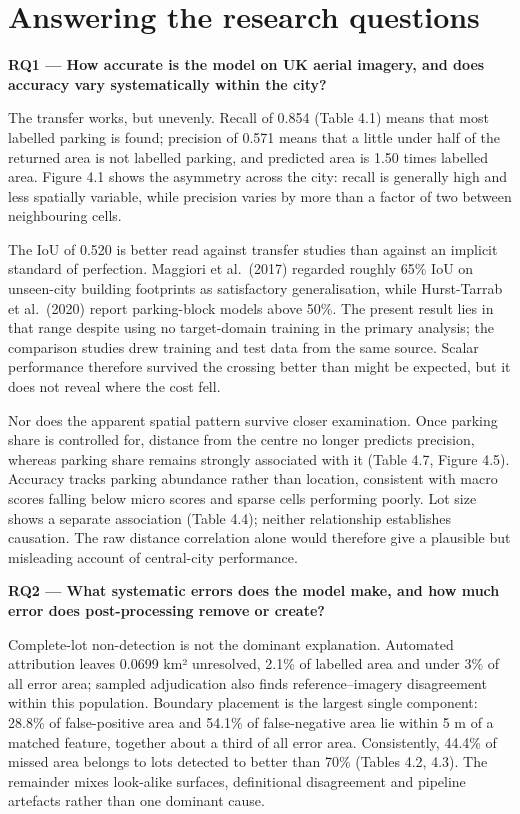 \hypertarget{answering-the-research-questions}{%
\section{Answering the research questions}\label{answering-the-research-questions}}

\textbf{RQ1 --- How accurate is the model on UK aerial imagery, and does accuracy vary systematically within the city?}

The transfer works, but unevenly. Recall of 0.854 (Table 4.1) means that most labelled parking is found; precision of 0.571 means that a little under half of the returned area is not labelled parking, and predicted area is 1.50 times labelled area. Figure 4.1 shows the asymmetry across the city: recall is generally high and less spatially variable, while precision varies by more than a factor of two between neighbouring cells.

The IoU of 0.520 is better read against transfer studies than against an implicit standard of perfection. Maggiori et al.~(2017) regarded roughly 65\% IoU on unseen-city building footprints as satisfactory generalisation, while Hurst-Tarrab et al.~(2020) report parking-block models above 50\%. The present result lies in that range despite using no target-domain training in the primary analysis; the comparison studies drew training and test data from the same source. Scalar performance therefore survived the crossing better than might be expected, but it does not reveal where the cost fell.

Nor does the apparent spatial pattern survive closer examination. Once parking share is controlled for, distance from the centre no longer predicts precision, whereas parking share remains strongly associated with it (Table 4.7, Figure 4.5). Accuracy tracks parking abundance rather than location, consistent with macro scores falling below micro scores and sparse cells performing poorly. Lot size shows a separate association (Table 4.4); neither relationship establishes causation. The raw distance correlation alone would therefore give a plausible but misleading account of central-city performance.

\textbf{RQ2 --- What systematic errors does the model make, and how much error does post-processing remove or create?}

Complete-lot non-detection is not the dominant explanation. Automated attribution leaves 0.0699 km² unresolved, 2.1\% of labelled area and under 3\% of all error area; sampled adjudication also finds reference--imagery disagreement within this population. Boundary placement is the largest single component: 28.8\% of false-positive area and 54.1\% of false-negative area lie within 5 m of a matched feature, together about a third of all error area. Consistently, 44.4\% of missed area belongs to lots detected to better than 70\% (Tables 4.2, 4.3). The remainder mixes look-alike surfaces, definitional disagreement and pipeline artefacts rather than one dominant cause.

